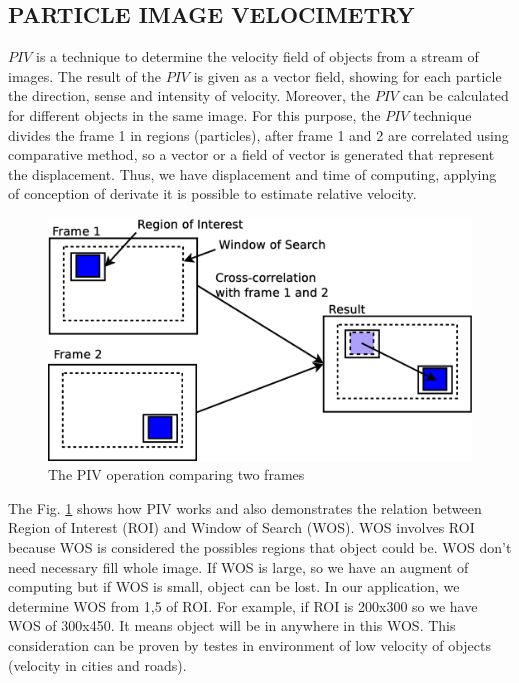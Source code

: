 
\subsection{PARTICLE IMAGE VELOCIMETRY}

$PIV$ is a technique to determine the  velocity field of objects from a stream of images\cite{Bastiaans}.
The result of the $PIV$ is given as a vector field, showing for each particle the direction, sense and intensity of velocity. 
Moreover, the $PIV$ can be calculated for different objects in the same image.
For this purpose, the $PIV$ technique divides the frame 1 in regions (particles), after frame 1 and 2 are correlated 
using comparative method, so a vector or a field of vector is generated that represent the displacement. Thus, we have 
displacement and time of computing, applying of conception of derivate it is possible to estimate relative velocity.

\begin{figure}[H]
\includegraphics[width=\columnwidth]{images/explanationPIV.eps}
\caption{The PIV operation comparing two frames}
\label{fig:twoframes}
\end{figure}

The Fig. \ref{fig:twoframes} shows how PIV works and also demonstrates the relation between Region of Interest (ROI) and 
Window of Search (WOS). WOS involves ROI because WOS is considered the possibles regions that object could be. 
WOS don't need necessary fill whole image. If WOS is large, so we have an augment of computing but 
if WOS is small, object can be lost. In our application, we determine WOS from 1,5 of ROI. For example, 
if ROI is 200x300 so we have WOS of 300x450. It means object will be in anywhere in this WOS. This consideration can be
proven by testes in environment of low velocity of objects (velocity in cities and roads).


